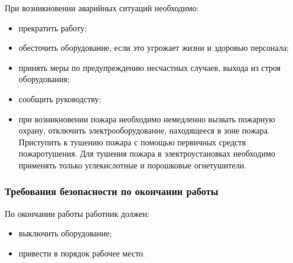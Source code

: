 При возникновении аварийных ситуаций необходимо:

\begin{itemize}
\item прекратить работу;
\item обесточить оборудование, если это угрожает жизни и здоровью персонала;
\item принять меры по предупреждению несчастных случаев, выхода из строя оборудования;
\item сообщить руководству;
\end{itemize}

\begin{itemize}
\item при возникновении пожара необходимо немедленно вызвать пожарную охрану, отключить электрооборудование, находящееся в зоне пожара. Приступить к тушению пожара с помощью первичных средств пожаротушения. Для тушения пожара в электроустановках необходимо применять только углекислотные и порошковые огнетушители.
\end{itemize}
\subsubsection{Требования безопасности по окончании работы}

По окончании работы работник должен:

\begin{itemize}
\item выключить оборудование;
\item привести в порядок рабочее место.
\end{itemize}